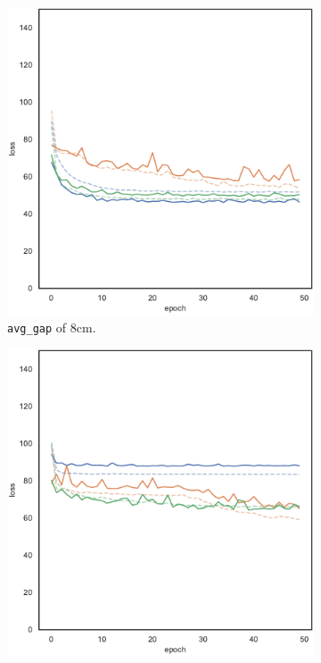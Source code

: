 \begin{figure}[!htb]
	\begin{center}
		\begin{subfigure}[h]{0.32\textwidth}
		\includegraphics[width=\textwidth]{contents/images/task1-comm/loss-distributed-gap_8@copy}
		\caption{\texttt{avg\_gap} of $8$\gls{cm}.}
		\end{subfigure}
		\hfill
		\begin{subfigure}[h]{0.32\textwidth}
			\includegraphics[width=\textwidth]{contents/images/task1-comm/loss-distributed-gap_13@copy}%

\end{subfigure}
\end{center}
\end{figure}
